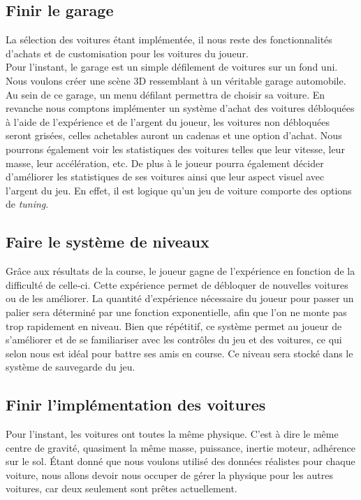 \documentclass[12pt,a4paper]{article}
\begin{document}
        \subsection{Finir le garage}
            La sélection des voitures étant implémentée, il nous reste des fonctionnalités
            d'achats et de customisation pour les voitures du joueur.\\
            Pour l'instant, le garage est un simple défilement de voitures sur un fond uni.
            Nous voulons créer une scène 3D ressemblant à un véritable garage automobile.
            Au sein de ce garage, un menu défilant permettra de choisir sa voiture.
            En revanche nous comptons implémenter un système d'achat des voitures débloquées
            à l'aide de l'expérience et de l'argent du joueur, les voitures non débloquées
            seront grisées, celles achetables auront un cadenas et une option d'achat.
            Nous pourrons également voir les statistiques des voitures telles que leur vitesse,
            leur masse, leur accélération, etc. De plus à le joueur pourra également décider
            d'améliorer les statistiques de ses voitures ainsi que leur aspect visuel avec l'argent
            du jeu. En effet, il est logique qu'un jeu de voiture comporte des options de
            \textsl{tuning}.

        \subsection{Faire le système de niveaux}
            Grâce aux résultats de la course, le joueur gagne de l'expérience en fonction de la
            difficulté de celle-ci. Cette expérience permet de débloquer de nouvelles voitures
            ou de les améliorer. La quantité d'expérience nécessaire du joueur pour passer un palier
            sera déterminé par une fonction exponentielle, afin que l'on ne monte pas trop rapidement 
            en niveau. Bien que répétitif, ce système permet au joueur 
            de s'améliorer et de se familiariser avec les contrôles du 
            jeu et des voitures, ce qui selon nous est idéal pour battre ses amis en course.
            Ce niveau sera stocké dans le système de sauvegarde du jeu.
            
        \subsection{Finir l'implémentation des voitures}
           Pour l'instant, les voitures ont toutes la même physique. C'est à dire le même
           centre de gravité, quasiment la même masse, puissance, inertie moteur, adhérence sur le 
           sol.
           Étant donné que nous voulons utilisé des données réalistes pour chaque voiture,
           nous allons devoir nous occuper de gérer la physique pour les autres voitures,
           car deux seulement sont prêtes actuellement.
\end{document}

